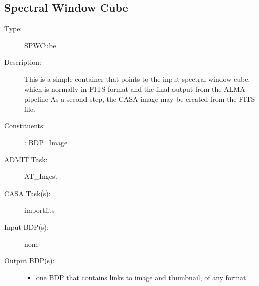 \subsection{Spectral Window Cube}
\begin{description}
\item[Type:] SPWCube
\item[Description:]

This is a simple container that points to the input spectral window cube,
which is normally in FITS format and the final output from the ALMA pipeline
As a second step, the CASA image may be created from the FITS file.

\item[Constituents:]: BDP\_Image

\item[ADMIT Task:]  AT\_Ingest

\item[CASA Task(s):] importfits

\item[Input BDP(s):] none

\item[Output BDP(s):]  
 \begin{itemize}
 \item one BDP that contains links to image and thumbnail, of any format.
 \end{itemize}

\end{description}
